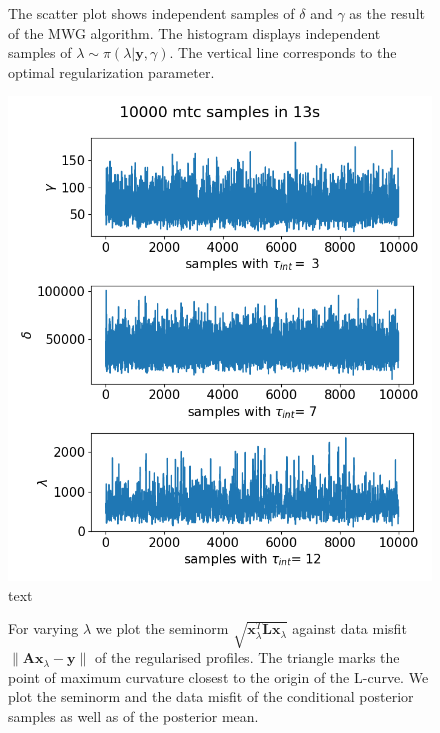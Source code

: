 \begin{figure}[!ht]
	\centering
	\renewcommand\sffamily{}
	\renewcommand{\mathbf}{\bm}
	\scalebox{0.66}{}
	\caption{The scatter plot shows independent samples of $\delta$ and $\gamma$ as the result of the MWG algorithm.
		The histogram displays independent samples of $\lambda \sim \pi(\lambda | \bm{y}, \gamma)$.
		The vertical line corresponds to the optimal regularization parameter.}
	\label{fig:AllHistRes}
\end{figure}
\begin{figure}[h]
	\centering
	\includegraphics[width=\textwidth]{TraceMTCPara.png}
	\caption[]{text}
	\label{fig:Results}
\end{figure}



\begin{figure}[!ht]
	\centering
	\renewcommand\sffamily{}
	\renewcommand{\mathbf}{\bm}
	\scalebox{0.66}{}
	\caption{For varying $\lambda$ we plot the seminorm $\sqrt{\bm{x}_\lambda^T\mathbf{L} \bm{x}_\lambda}$ against data misfit $\lVert \bm{Ax}_\lambda - \bm{y} \rVert$ of the regularised profiles.
		The triangle marks the point of maximum curvature closest to the origin of the L-curve.
		We plot the seminorm and the data misfit of the conditional posterior samples as well as of the posterior mean.}
	\label{fig:RegCurv}
\end{figure}

